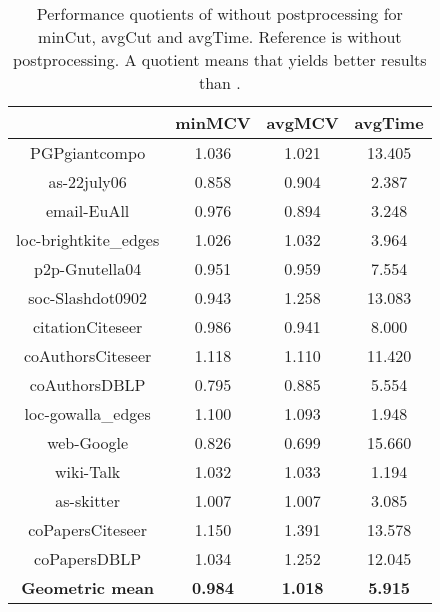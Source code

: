 \documentclass[pdftex]{llncs}
\numberwithin{equation}{section}
\numberwithin{example}{section}
\numberwithin{table}{section}
\begin{document}
\begin{table}[tb]
  \caption{Performance quotients of  without postprocessing for minCut, avgCut
    and avgTime. Reference is  without postprocessing. A quotient  means that
     yields better results than .}
\begin{center}
\begin{tabular}{ c | c  c | c }
& minMCV  & avgMCV & avgTime\\
                        \hline \hline
PGPgiantcompo           &  1.036              &  1.021               &  13.405               \\ \hline
as-22july06             &  0.858              &  0.904               &   2.387               \\ \hline
email-EuAll             &  0.976              &  0.894               &   3.248               \\ \hline
loc-brightkite\_edges   &  1.026              &  1.032               &   3.964               \\ \hline
p2p-Gnutella04          &  0.951              &  0.959               &   7.554               \\ \hline
soc-Slashdot0902        &  0.943              &  1.258               &  13.083               \\ \hline
citationCiteseer        &  0.986              &  0.941               &   8.000               \\ \hline
coAuthorsCiteseer       &  1.118              &  1.110               &  11.420               \\ \hline 
coAuthorsDBLP           &  0.795              &  0.885               &   5.554               \\ \hline
loc-gowalla\_edges      &  1.100              &  1.093               &   1.948               \\ \hline
web-Google              &  0.826              &  0.699               &  15.660               \\ \hline
wiki-Talk               &  1.032              &  1.033               &   1.194               \\ \hline
as-skitter              &  1.007              &  1.007               &   3.085               \\ \hline
coPapersCiteseer        &  1.150              &  1.391               &  13.578               \\ \hline
coPapersDBLP            &  1.034              &  1.252               &  12.045               \\ \hline  \hline
\textbf{Geometric mean} &  \textbf{0.984}     &  \textbf{1.018}      &\textbf{5.915}         \\ \hline
\end{tabular}
\end{center}
\label{tab:cut_100}
\end{table}
\end{document}
